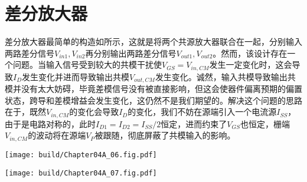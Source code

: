\section{差分放大器}
差分放大器最简单的构造如所示，这就是将两个共源放大器联合在一起，分别输入两路差分信号$V_{in1},V_{in2}$再分别输出两路差分信号$V_{out1},V_{out2}$。然而，该设计存在一个问题。当输入信号受到较大的共模干扰使$V_{GS}=V_{in,CM}$发生一定变化时，这会导致$I_{D}$发生变化并进而导致输出共模$V_{out,CM}$发生变化。诚然，输入共模导致输出共模并没有太大妨碍，毕竟差模信号没有被直接影响，但这会使器件偏离预期的偏置状态，跨导和差模增益会发生变化，这仍然不是我们期望的。解决这个问题的思路在于，既然$V_{in,CM}$的变化会导致$I_D$的变化，我们不妨在源端引入一个电流源$I_{SS}$，由于是电路对称的，此时$I_{D1}=I_{D2}=I_{SS}/2$恒定，进而约束了$V_{GS}$也恒定，栅端$V_{in,CM}$的波动将在源端$V_P$被跟随，彻底屏蔽了共模输入的影响。

\begin{Figure}[差分放大器]
    \begin{FigureSub}[简单差分电路]
        \texttt{[image: build/Chapter04A\_06.fig.pdf]}
    \end{FigureSub}
    \hspace{0.5cm}
    \begin{FigureSub}[基本差分电路]
        \texttt{[image: build/Chapter04A\_07.fig.pdf]}
    \end{FigureSub}
\end{Figure}

